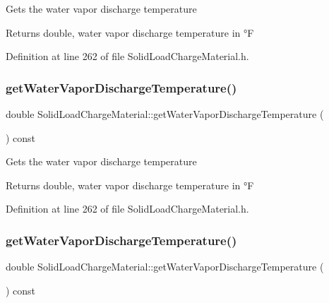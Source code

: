 Gets the water vapor discharge temperature \begin{DoxyReturn}{Returns}
double, water vapor discharge temperature in °F 
\end{DoxyReturn}


Definition at line 262 of file Solid\+Load\+Charge\+Material.\+h.

\mbox{\label{class_solid_load_charge_material_a267f26d42f8ba2655c09f561fc0f6cb1}} 
\subsubsection{\texorpdfstring{get\+Water\+Vapor\+Discharge\+Temperature()}{getWaterVaporDischargeTemperature()}\hspace{0.1cm}{\footnotesize\ttfamily [2/3]}}
{\footnotesize\ttfamily double Solid\+Load\+Charge\+Material\+::get\+Water\+Vapor\+Discharge\+Temperature (\begin{DoxyParamCaption}{ }\end{DoxyParamCaption}) const\hspace{0.3cm}{\ttfamily [inline]}}

Gets the water vapor discharge temperature \begin{DoxyReturn}{Returns}
double, water vapor discharge temperature in °F 
\end{DoxyReturn}


Definition at line 262 of file Solid\+Load\+Charge\+Material.\+h.

\mbox{\label{class_solid_load_charge_material_a267f26d42f8ba2655c09f561fc0f6cb1}} 
\subsubsection{\texorpdfstring{get\+Water\+Vapor\+Discharge\+Temperature()}{getWaterVaporDischargeTemperature()}\hspace{0.1cm}{\footnotesize\ttfamily [3/3]}}
{\footnotesize\ttfamily double Solid\+Load\+Charge\+Material\+::get\+Water\+Vapor\+Discharge\+Temperature (\begin{DoxyParamCaption}{ }\end{DoxyParamCaption}) const\hspace{0.3cm}{\ttfamily [inline]}}

